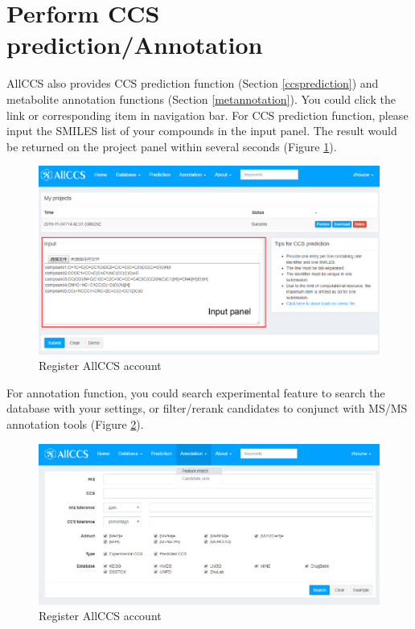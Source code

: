 \documentclass[12pt,]{book}
\begin{document}
\section{Perform CCS
prediction/Annotation}\label{perform-ccs-predictionannotation}

AllCCS also provides CCS prediction function (Section
\ref{ccsprediction}) and metabolite annotation functions (Section
\ref{metannotation}). You could click the link or corresponding item in
navigation bar. For CCS prediction function, please input the SMILES
list of your compounds in the input panel. The result would be returned
on the project panel within several seconds (Figure
\ref{fig:FigPrediction}).

\begin{figure}

{\centering \includegraphics{images/chapter1/prediction} 

}

\caption{Register AllCCS account}\label{fig:FigPrediction}
\end{figure}

For annotation function, you could search experimental feature to search
the database with your settings, or filter/rerank candidates to conjunct
with MS/MS annotation tools (Figure \ref{fig:FigMatch}).

\begin{figure}

{\centering \includegraphics{images/chapter1/match} 

}

\caption{Register AllCCS account}\label{fig:FigMatch}
\end{figure}
\end{document}
